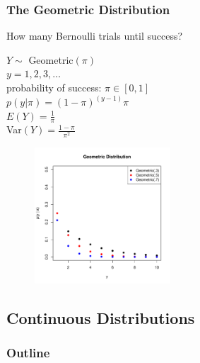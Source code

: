 \documentclass[handout]{beamer}
\begin{document}
\begin{frame}
\frametitle{The Geometric Distribution}
\pause
How many Bernoulli trials until success?
\begin{multicols}{2}
\pause
$Y \sim$ Geometric$(\pi)$\\
\bigskip
\pause
$y = 1,2,3,\dots$\\
\bigskip
\pause
probability of success: $\pi \in [0,1]$\\
\bigskip
\pause
$p(y|\pi) = (1 - \pi)^{(y-1)} \pi$\\
\bigskip
\bigskip
\pause
$E(Y) = \frac{1}{\pi}$\\
\bigskip
\pause
Var$(Y) = \frac{1 - \pi}{\pi^2}$
\pause


\begin{figure}[!htp]
\begin{center}
\includegraphics[width=2in, height=2in]{probability-geometric.pdf}
\end{center}
\end{figure}
\end{multicols}
\end{frame}

\subsection{Continuous Distributions}


\begin{frame}
\frametitle{Outline}
\tableofcontents[currentsubsection]
\end{frame}
\end{document}
